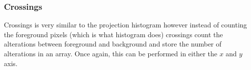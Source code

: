 \subsubsection{Crossings}
Crossings is very similar to the projection histogram however instead of counting the foreground pixels (which is what histogram does) crossings count the alterations between foreground and background and store the number of alterations in an array. Once again, this can be performed in either the $x$ and $y$ axis.